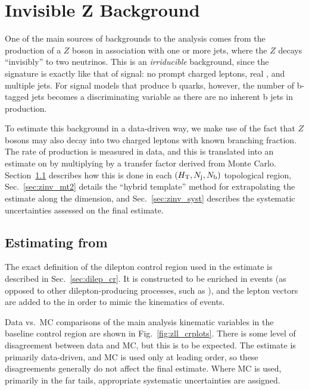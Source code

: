 \chapter{Invisible Z Background}
\label{chap:zinv}

One of the main sources of backgrounds to the \mttwo analysis comes from the production of a $Z$
boson in association with one or more jets, where the $Z$ decays ``invisibly'' to two neutrinos.
This is an \emph{irriducible} background, since the signature is exactly like that of signal:
no prompt charged leptons, real \ptmiss, and multiple jets. For signal models that produce
b quarks, however, the number of b-tagged jets becomes a discriminating variable as there are
no inherent b jets in \zjets production.

To estimate this background in a data-driven way, we make use of the fact that $Z$ bosons may also decay into two
charged leptons with known branching fraction. The rate of \zll production is measured in data, and this is
translated into an estimate on \znunu by multiplying by a transfer factor derived from Monte Carlo.
Section~\ref{sec:znunu_from_zll} describes how this is done in each $(H_{\mathrm{T}},N_{\mathrm{j}},N_{\mathrm{b}})$ topological region,
Sec.~\ref{sec:zinv_mt2} details the ``hybrid template'' method for extrapolating the estimate along the
\mttwo dimension, and Sec.~\ref{sec:zinv_syst} describes the systematic uncertainties assessed on the 
final estimate.

\section{Estimating \texorpdfstring{\znunu}{Z} from \texorpdfstring{\zll}{Zll}}
\label{sec:znunu_from_zll}
The exact definition of the dilepton control region used in the \znunu estimate is described in Sec.~\ref{sec:dilep_cr}.
It is constructed to be enriched in \zll events (as opposed to other dilepton-producing processes, such as \ttbar),
and the lepton  vectors are added to the \vMet in order to mimic the kinematics of \znunu events.

Data vs.\ MC comparisons of the main analysis kinematic variables in the baseline \zll control region are 
shown in Fig.~\ref{fig:zll_crplots}. There is some level of disagreement between data and MC, but this is
to be expected. The estimate is primarily data-driven, and MC is used only at leading order, so these
disagreements generally do not affect the final estimate. Where MC is used, primarily in the far
\mttwo tails, appropriate systematic uncertainties are assigned.

